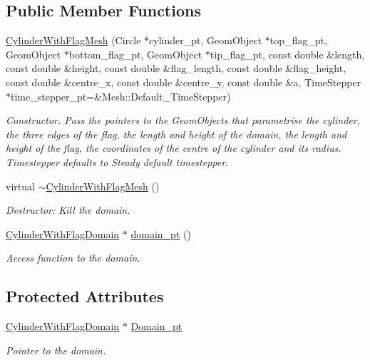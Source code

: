 \subsection*{Public Member Functions}
\begin{DoxyCompactItemize}
\item 
\hyperlink{classoomph_1_1CylinderWithFlagMesh_a6591a2b9fdcb8080c899e34b9c8277cd}{Cylinder\+With\+Flag\+Mesh} (Circle $\ast$cylinder\+\_\+pt, Geom\+Object $\ast$top\+\_\+flag\+\_\+pt, Geom\+Object $\ast$bottom\+\_\+flag\+\_\+pt, Geom\+Object $\ast$tip\+\_\+flag\+\_\+pt, const double \&length, const double \&height, const double \&flag\+\_\+length, const double \&flag\+\_\+height, const double \&centre\+\_\+x, const double \&centre\+\_\+y, const double \&a, Time\+Stepper $\ast$time\+\_\+stepper\+\_\+pt=\&Mesh\+::\+Default\+\_\+\+Time\+Stepper)
\begin{DoxyCompactList}\small\item\em Constructor. Pass the pointers to the Geom\+Objects that parametrise the cylinder, the three edges of the flag, the length and height of the domain, the length and height of the flag, the coordinates of the centre of the cylinder and its radius. Timestepper defaults to Steady default timestepper. \end{DoxyCompactList}\item 
virtual \hyperlink{classoomph_1_1CylinderWithFlagMesh_a04fb9a6ea7a70eb8dbfb83ef73ed7b48}{$\sim$\+Cylinder\+With\+Flag\+Mesh} ()
\begin{DoxyCompactList}\small\item\em Destructor\+: Kill the domain. \end{DoxyCompactList}\item 
\hyperlink{classoomph_1_1CylinderWithFlagDomain}{Cylinder\+With\+Flag\+Domain} $\ast$ \hyperlink{classoomph_1_1CylinderWithFlagMesh_abfaa03615a4a6f99ddc9100f739cb94f}{domain\+\_\+pt} ()
\begin{DoxyCompactList}\small\item\em Access function to the domain. \end{DoxyCompactList}\end{DoxyCompactItemize}
\subsection*{Protected Attributes}
\begin{DoxyCompactItemize}
\item 
\hyperlink{classoomph_1_1CylinderWithFlagDomain}{Cylinder\+With\+Flag\+Domain} $\ast$ \hyperlink{classoomph_1_1CylinderWithFlagMesh_a257b36fed6fb0d20d108a27c6a1c5f86}{Domain\+\_\+pt}
\begin{DoxyCompactList}\small\item\em Pointer to the domain. \end{DoxyCompactList}\end{DoxyCompactItemize}


